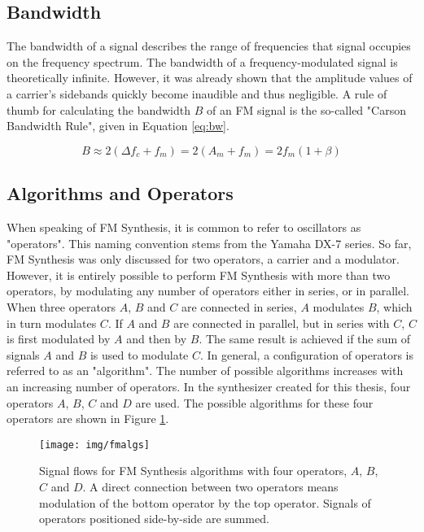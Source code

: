   \subsection{Bandwidth}

  The bandwidth of a signal describes the range of frequencies that signal occupies on the frequency spectrum. The bandwidth of a frequency-modulated signal is theoretically infinite. However, it was already shown that the amplitude values of a carrier's sidebands quickly become inaudible and thus negligible. A rule of thumb for calculating the bandwidth $B$ of an FM signal is the so-called "Carson Bandwidth Rule", given in Equation \ref{eq:bw}.

  \begin{equation}
    B \approx 2(\Delta f_{c} + f_{m}) = 2(A_{m} + f_{m}) = 2f_{m}(1 + \beta)
    \label{eq:bw}
  \end{equation}

  \subsection{Algorithms and Operators}

  When speaking of FM Synthesis, it is common to refer to oscillators as "operators". This naming convention stems from the Yamaha DX-7 series. So far, FM Synthesis was only discussed for two operators, a carrier and a modulator. However, it is entirely possible to perform FM Synthesis with more than two operators, by modulating any number of operators either in series, or in parallel. When three operators $A$, $B$ and $C$ are connected in series, $A$ modulates $B$, which in turn modulates $C$. If $A$ and $B$ are connected in parallel, but in series with $C$, $C$ is first modulated by $A$ and then by $B$. The same result is achieved if the sum of signals $A$ and $B$ is used to modulate $C$. In general, a configuration of operators is referred to as an "algorithm". The number of possible algorithms increases with an increasing number of operators. In the synthesizer created for this thesis, four operators $A$, $B$, $C$ and $D$ are used. The possible algorithms for these four operators are shown in Figure \ref{fig:fmalgs}.

  \begin{figure}[p!]
    \texttt{[image: img/fmalgs]}
    \caption{Signal flows for FM Synthesis algorithms with four operators, $A$, $B$, $C$ and $D$. A direct connection between two operators means modulation of the bottom operator by the top operator. Signals of operators positioned side-by-side are summed.}
    \label{fig:fmalgs}
  \end{figure}

